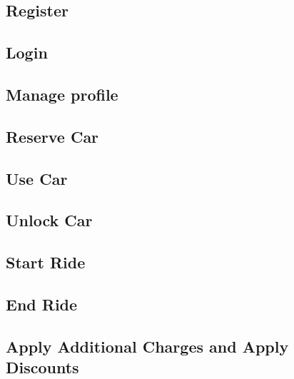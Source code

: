 \subsection{Register}


\subsection{Login}


\subsection{Manage profile}


\subsection{Reserve Car}


\subsection{Use Car}


\subsection{Unlock Car} \label{unlock_car_section}


\subsection{Start Ride} \label{start_ride_section}


\subsection{End Ride} \label{end_ride_section}


\subsection{Apply Additional Charges and Apply Discounts}


